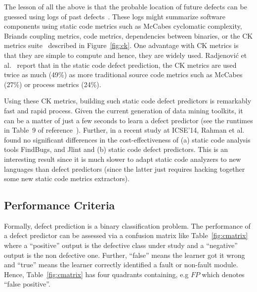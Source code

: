 \documentclass[10pt,conference]{IEEEtran}
\theoremstyle{break}
\theoremstyle{break}
\begin{document}
The lesson of all the above  is that the probable location
of future defects can be guessed using   logs of past defects~\cite{hall2012systematic, catal2009systematic}. These logs might
summarize software components using
static code metrics such as 
McCabes  cyclomatic  complexity, Briands coupling metrics, code metrics,  
dependencies between  binaries, or
the  CK  metrics  suite~\cite{chidamber1994metrics} described in  Figure~\ref{fig:ck}. 
One advantage with CK metrics is that they are  simple  to  compute and hence,
they are widely used. Radjenovi{\'c} et al.~\cite{radjenovic2013software} report that in
the static code defect prediction, the CK metrics are
used  twice as much (49\%) 
as more traditional source code metrics such as McCabes (27\%) or process metrics (24\%).

Using these CK metrics, building such static code defect predictors is remarkably fast and rapid process.
Given the current generation of data mining toolkits, it can be a matter
of just a few seconds to learn a defect predictor (see the runtimes in Table~9 of reference~\cite{fu2016tuning}). Further, in a recent study at ICSE'14, Rahman et
al.~\cite{Rahman14} found no significant differences in the cost-effectiveness
of
(a) static code analysis tools FindBugs, and Jlint and (b) static code defect predictors.
This is an interesting result since it is  much slower to adapt static code
analyzers to new  languages than defect predictors (since the latter just requires hacking together some new
static code metrics extractors).

\subsection{Performance Criteria}
\label{sect:performance}



Formally, defect prediction is a binary classification problem.
The performance of a defect predictor can be assessed via a  confusion matrix like Table~\ref{fig:cmatrix}
where a ``positive'' output is the defective class under study and a ``negative'' output is the non defective one.
Further, ``false'' means the learner got it wrong and ``true'' means the learner correctly identified
a fault or non-fault module. Hence, Table~\ref{fig:cmatrix} has four quadrants containing, e.g $\mathit{FP}$ which denotes ``false positive''.
\end{document}
